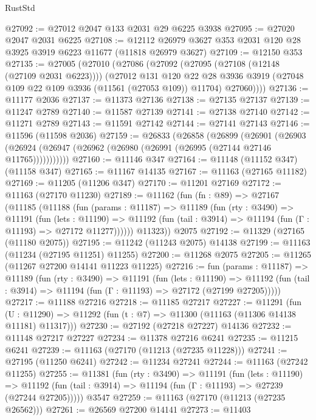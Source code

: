\begin{lexlean}{RustStd}
\begin{coremodule}
@27092 := @27012 @2047 @133 @2031 @29 @6225 @3938
@27095 := @27020 @2047 @2031 @6225
@27108 := @12112 @26979 @3627 @353 @2031 @120 @28 @3925 @3919 @6223 @11677 (@11818 @26979 @3627)
@27109 := @12150 @353
@27135 := @27005
    (@27010
      (@27086
        (@27092
          (@27095 (@27108 (@12148 (@27109 @2031 @6223))))
          (@27012
            @131
            @120
            @22
            @28
            @3936
            @3919
            (@27048 @109 @22 @109 @3936 (@11561 (@27053 @109)) @11704)
            @27060))))
@27136 := @11177 @2036
@27137 := @11373 @27136
@27138 := @27135 @27137
@27139 := @11247 @2789
@27140 := @11587 @27139
@27141 := @27138 @27140
@27142 := @11271 @2789
@27143 := @11591 @27142
@27144 := @27141 @27143
@27146 := @11596 (@11598 @2036)
@27159 := @26833
    (@26858
      (@26899
        (@26901
          (@26903 (@26924 (@26947 (@26962 (@26980 (@26991 (@26995 (@27144 @27146 @11765)))))))))))
@27160 := @11146 @347
@27164 := @11148 (@11152 @347) (@11158 @347)
@27165 := @11167 @14135
@27167 := @11163 (@27165 @11182)
@27169 := @11205 (@11206 @347)
@27170 := @11201 @27169
@27172 := @11163 (@27170 @11230)
@27189 := @11162
    (fun (fn : @89) =>
    @27167
      (@11185
        (@11188
          (fun (params : @11187) =>
          @11189
            (fun (rty : @3490) =>
            @11191
              (fun (lets : @11190) =>
              @11192 (fun (tail : @3914) => @11194 (fun (Γ : @11193) => @27172 @11277))))))
        @11323))
    @2075
@27192 := @11329 (@27165 (@11180 @2075))
@27195 := @11242 (@11243 @2075) @14138
@27199 := @11163 (@11234 (@27195 @11251) @11255)
@27200 := @11268 @2075
@27205 := @11265 (@11267 @27200 @14141 @11223 @11225)
@27216 := fun (params : @11187) =>
  @11189
    (fun (rty : @3490) =>
    @11191
      (fun (lets : @11190) =>
      @11192 (fun (tail : @3914) => @11194 (fun (Γ : @11193) => @27172 (@27199 @27205)))))
@27217 := @11188 @27216
@27218 := @11185 @27217
@27227 := @11291
    (fun (U : @11290) => @11292 (fun (t : @7) => @11300 (@11163 (@11306 @14138 @11181) @11317)))
@27230 := @27192 (@27218 @27227) @14136
@27232 := @11148 @27217 @27227
@27234 := @11378 @27216 @6241
@27235 := @11215 @6241
@27239 := @11163 (@27170 (@11213 (@27235 @11228)))
@27241 := @27195 (@11250 @6241)
@27242 := @11234 @27241
@27244 := @11163 (@27242 @11255)
@27255 := @11381
    (fun (rty : @3490) =>
    @11191
      (fun (lets : @11190) =>
      @11192 (fun (tail : @3914) => @11194 (fun (Γ : @11193) => @27239 (@27244 @27205)))))
    @3547
@27259 := @11163 (@27170 (@11213 (@27235 @26562)))
@27261 := @26569 @27200 @14141
@27273 := @11403

\end{coremodule}
\end{lexlean}
